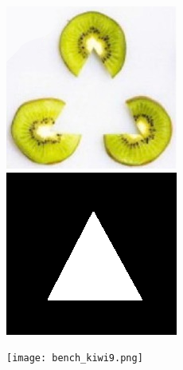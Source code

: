 \documentclass[a4paper, 10pt]{article}
\begin{document}
\begin{figure}[H]
\begin{minipage}{.4\textwidth}
\centering
\includegraphics[scale=0.23]{images/kiwi.png}
\end{minipage}%
\begin{minipage}{.4\textwidth}
\centering
\includegraphics[scale=0.23]{images/kiwi_mask.png}
\end{minipage}%
\begin{minipage}{.4\textwidth}
\centering
\texttt{[image: bench\_kiwi9.png]}
\end{minipage}%
\end{figure}
\end{document}

